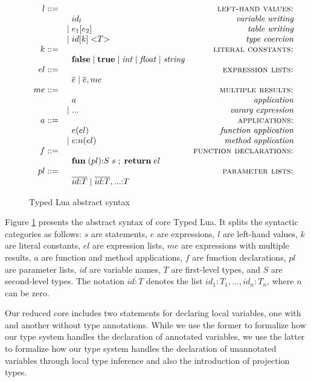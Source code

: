 \begin{figure}[!ht]
$$\begin{array}{rlr}
l ::= & & \textsc{left-hand values:}\\
& \;\; id_{l} & \textit{variable writing}\\
& | \; e_{1}[e_{2}] & \textit{table writing}\\
& | \; id[k] \; {<}T{>} & \textit{type coercion}\\
k ::= & & \textsc{literal constants:}\\
& \;\; \mathbf{false} \; | \;
\mathbf{true} \; | \;
{\it int} \; | \;
{\it float} \; | \;
{\it string} & \\
el ::= & & \textsc{expression lists:}\\
& \;\; \overline{e} \; | \;
\overline{e}, me & \\
me ::= & & \textsc{multiple results:}\\
& \;\; a & \textit{application}\\
& | \; {...} & \textit{vararg expression}\\
a ::= & & \textsc{applications:}\\
& \;\; e(el) & \textit{function application}\\
& | \; e{:}n(el) & \textit{method application}\\
f ::= & & \textsc{function declarations:}\\
& \;\; \mathbf{fun} \; (pl){:}S \; s \;;\; \mathbf{return} \; el & \\
pl ::= & & \textsc{parameter lists:}\\
& \;\; \overline{id{:}T} \; | \;
\overline{id{:}T},{...}{:}T & \\
\end{array}
$$
\dend
\caption{Typed Lua abstract syntax}
\label{fig:syntax}
\end{figure}

Figure \ref{fig:syntax} presents the abstract syntax of core Typed Lua.
It splits the syntactic categories as follows:
$s$ are statements, $e$ are expressions, $l$ are left-hand values,
$k$ are literal constants, $el$ are expression lists,
$me$ are expressions with multiple results, $a$ are function and method applications,
$f$ are function declarations, $pl$ are parameter lists,
$id$ are variable names, $T$ are first-level types, and $S$ are second-level types.
The notation $\overline{id{:}T}$ denotes the list $id_{1}{:}T_{1}, ..., id_{n}{:}T_{n}$,
where $n$ can be zero.

Our reduced core includes two statements for declaring local variables,
one with and another without type annotations.
While we use the former to formalize how our type system handles the declaration
of annotated variables, we use the latter to formalize how our type system
handles the declaration of unannotated variables through local type inference
and also the introduction of projection types.

